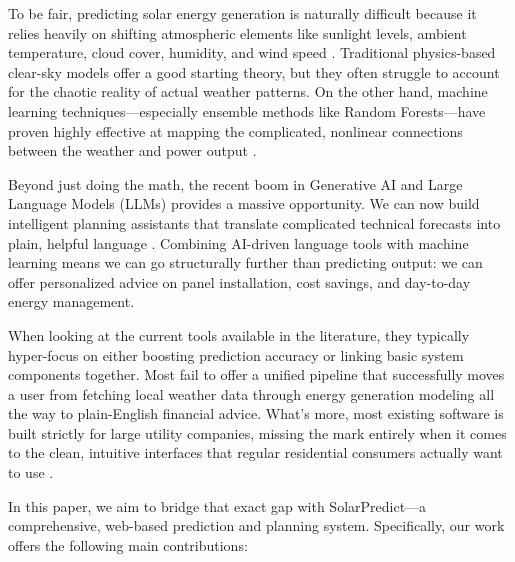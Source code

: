 \documentclass[conference]{IEEEtran}
\begin{document}
To be fair, predicting solar energy generation is naturally difficult because it relies heavily on shifting atmospheric elements like sunlight levels, ambient temperature, cloud cover, humidity, and wind speed \cite{b3}. Traditional physics-based clear-sky models offer a good starting theory, but they often struggle to account for the chaotic reality of actual weather patterns. On the other hand, machine learning techniques---especially ensemble methods like Random Forests---have proven highly effective at mapping the complicated, nonlinear connections between the weather and power output \cite{b4}.

Beyond just doing the math, the recent boom in Generative AI and Large Language Models (LLMs) provides a massive opportunity. We can now build intelligent planning assistants that translate complicated technical forecasts into plain, helpful language \cite{b11}. Combining AI-driven language tools with machine learning means we can go structurally further than predicting output: we can offer personalized advice on panel installation, cost savings, and day-to-day energy management.

When looking at the current tools available in the literature, they typically hyper-focus on either boosting prediction accuracy or linking basic system components together. Most fail to offer a unified pipeline that successfully moves a user from fetching local weather data through energy generation modeling all the way to plain-English financial advice. What's more, most existing software is built strictly for large utility companies, missing the mark entirely when it comes to the clean, intuitive interfaces that regular residential consumers actually want to use \cite{b5}.

In this paper, we aim to bridge that exact gap with SolarPredict---a comprehensive, web-based prediction and planning system. Specifically, our work offers the following main contributions:
\end{document}
